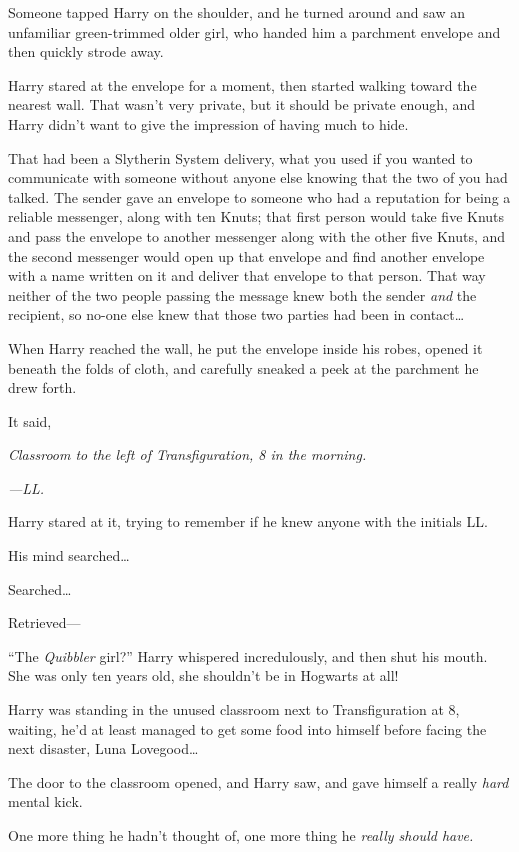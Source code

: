 Someone tapped Harry on the shoulder, and he turned around and saw an unfamiliar green-trimmed older girl, who handed him a parchment envelope and then quickly strode away.

Harry stared at the envelope for a moment, then started walking toward the nearest wall. That wasn’t very private, but it should be private enough, and Harry didn’t want to give the impression of having much to hide.

That had been a Slytherin System delivery, what you used if you wanted to communicate with someone without anyone else knowing that the two of you had talked. The sender gave an envelope to someone who had a reputation for being a reliable messenger, along with ten Knuts; that first person would take five Knuts and pass the envelope to another messenger along with the other five Knuts, and the second messenger would open up that envelope and find another envelope with a name written on it and deliver that envelope to that person. That way neither of the two people passing the message knew both the sender \emph{and} the recipient, so no-one else knew that those two parties had been in contact…

When Harry reached the wall, he put the envelope inside his robes, opened it beneath the folds of cloth, and carefully sneaked a peek at the parchment he drew forth.

It said,

\emph{Classroom to the left of Transfiguration, 8 in the morning.}

\emph{—LL.}

Harry stared at it, trying to remember if he knew anyone with the initials LL.

His mind searched…

Searched…

Retrieved—

“The \emph{Quibbler} girl?” Harry whispered incredulously, and then shut his mouth. She was only ten years old, she shouldn’t be in Hogwarts at all!


Harry was standing in the unused classroom next to Transfiguration at 8\am, waiting, he’d at least managed to get some food into himself before facing the next disaster, Luna Lovegood…

The door to the classroom opened, and Harry saw, and gave himself a really \emph{hard} mental kick.

One more thing he hadn’t thought of, one more thing he \emph{really should have.}

